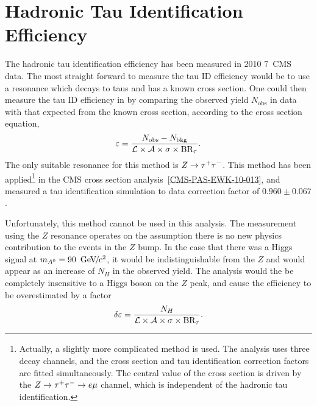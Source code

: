 \section{Hadronic Tau Identification Efficiency}
\label{sec:HadTauIdEff}
%
The hadronic tau identification efficiency has been measured in 2010 7~\TeV CMS
data.  The most straight forward to measure the tau ID efficiency would be to
use a resonance which decays to taus and has a known cross section.  One could
then measure the tau ID efficiency in by comparing the observed yield
$N_\text{obs}$ in data with that expected from the known cross section,
according to the cross section equation,
\begin{equation}
  \varepsilon = \frac{N_\text{obs} - N_\text{bkg}}
  {\mathcal{L} \times \mathcal{A} \times \mbox{\ensuremath{\sigma \times \text{BR}_\tau}}}.
  \nonumber
\end{equation}
The only suitable resonance for this method is $Z\to\tau^+\tau^-$.  This method has been
applied\footnote{Actually, a slightly more complicated method is used. The
analysis uses three decay channels, and the \ZTT cross section and tau
identification correction factors are fitted simultaneously. The central value
of the \ZTT cross section is driven by the $\mbox{\ensuremath{Z\to\tau^+\tau^-}} \to e \mu$ channel, which is
independent of the hadronic tau identification.} in the CMS \ZTT cross section
analysis~\ref{CMS-PAS-EWK-10-013}, and measured a tau identification simulation
to data correction factor of \mbox{$0.960 \pm 0.067$}.

Unfortunately, this method cannot be used in this analysis.  The measurement
using the $Z$ resonance operates on the assumption there is no new physics
contribution to the events in the $Z$ bump.  In the case that there was a Higgs
signal at $m_{A^0} = 90~{\,\text{Ge\hspace{-.08em}V\hspace{-0.16em}/\hspace{-0.08em}}c^\text{2}}$, it would be indistinguishable from the $Z$ and
would appear as an increase of $N_{H}$ in the observed yield.  The analysis
would the be completely insensitive to a Higgs boson on the $Z$ peak, and cause
the efficiency to be overestimated by a factor 
\begin{equation}
  \delta \varepsilon = \frac{N_H}
  {\mathcal{L} \times \mathcal{A} \times \mbox{\ensuremath{\sigma \times \text{BR}_\tau}}}.
  \nonumber
\end{equation}

